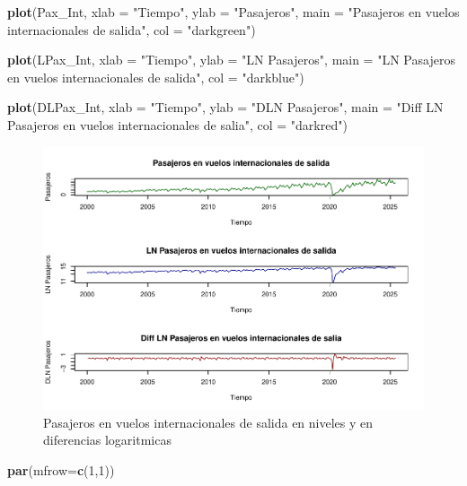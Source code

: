 \documentclass[
]{book}
\newenvironment{Shaded}{\begin{snugshade}}{\end{snugshade}}
\newcommand{\AttributeTok}[1]{\textcolor[rgb]{0.13,0.29,0.53}{#1}}
\newcommand{\DecValTok}[1]{\textcolor[rgb]{0.00,0.00,0.81}{#1}}
\newcommand{\FunctionTok}[1]{\textcolor[rgb]{0.13,0.29,0.53}{\textbf{#1}}}
\newcommand{\NormalTok}[1]{#1}
\newcommand{\StringTok}[1]{\textcolor[rgb]{0.31,0.60,0.02}{#1}}
\begin{document}
\begin{Shaded}
\begin{Highlighting}[]
\FunctionTok{plot}\NormalTok{(Pax\_Int, }\AttributeTok{xlab =} \StringTok{"Tiempo"}\NormalTok{, }\AttributeTok{ylab =} \StringTok{"Pasajeros"}\NormalTok{,}
     \AttributeTok{main =} \StringTok{"Pasajeros en vuelos internacionales de salida"}\NormalTok{,}
     \AttributeTok{col =} \StringTok{"darkgreen"}\NormalTok{)}

\FunctionTok{plot}\NormalTok{(LPax\_Int, }\AttributeTok{xlab =} \StringTok{"Tiempo"}\NormalTok{, }\AttributeTok{ylab =} \StringTok{"LN Pasajeros"}\NormalTok{,}
     \AttributeTok{main =} \StringTok{"LN Pasajeros en vuelos internacionales de salida"}\NormalTok{,}
     \AttributeTok{col =} \StringTok{"darkblue"}\NormalTok{)}

\FunctionTok{plot}\NormalTok{(DLPax\_Int, }\AttributeTok{xlab =} \StringTok{"Tiempo"}\NormalTok{, }\AttributeTok{ylab =} \StringTok{"DLN Pasajeros"}\NormalTok{,}
     \AttributeTok{main =} \StringTok{"Diff LN Pasajeros en vuelos internacionales de salia"}\NormalTok{, }
     \AttributeTok{col =} \StringTok{"darkred"}\NormalTok{)}
\end{Highlighting}
\end{Shaded}

\begin{figure}

{\centering \includegraphics{Notas-Series-Tiempo_files/figure-latex/fig49-1} 

}

\caption{Pasajeros en vuelos internacionales de salida en niveles y en diferencias logaritmicas}\label{fig:fig49}
\end{figure}

\begin{Shaded}
\begin{Highlighting}[]
\FunctionTok{par}\NormalTok{(}\AttributeTok{mfrow=}\FunctionTok{c}\NormalTok{(}\DecValTok{1}\NormalTok{,}\DecValTok{1}\NormalTok{))}
\end{Highlighting}
\end{Shaded}
\end{document}
